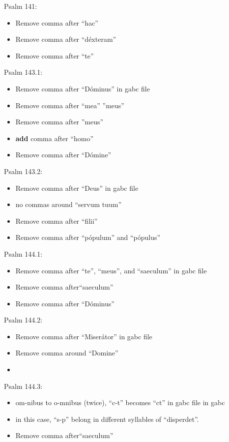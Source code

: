 \documentclass[11pt]{article}
\begin{document}
Psalm 141:
  \begin{itemize}
  \item Remove comma after ``hac''
  \item  Remove comma after ``déxteram''
    \item  Remove comma after ``te''

    \end{itemize}

      Psalm 143.1:
  \begin{itemize}
  \item Remove comma after ``Dóminus'' in gabc file
  \item  Remove comma after ``mea'' ''meus''
    \item  Remove comma after ''meus''
    \item
    \textbf{add} comma after ``homo''
      \item  Remove comma after ``Dómine'' 
    \end{itemize}

 Psalm 143.2:
  \begin{itemize}
  \item Remove comma after ``Deus'' in gabc file
    \item  no commas around ``servum tuum''
      \item Remove comma after ``filii'' 
   \item Remove comma after ``pópulum'' and ``pópulus'' 
    \end{itemize}

      Psalm 144.1:
  \begin{itemize}
    \item Remove comma after ``te'', ``meus'',  and ``saeculum'' in gabc file 
  \item   Remove comma after``saeculum''
    \item Remove comma after ``Dóminus'' 
    \end{itemize}

 Psalm 144.2:
  \begin{itemize}
      \item Remove comma after ``Miserátor'' in gabc file
  \item Remove comma around ``Domine''
  \item  
    \end{itemize}

 Psalm 144.3:
  \begin{itemize}
  \item om-nibus to o-mnibus (twice),  ``c-t'' becomes ``ct'' in gabc file in gabc
     \item in this case, ``s-p'' belong in different syllables of ``disperdet''.
  \item  Remove comma after``saeculum''
    \end{itemize}
\end{document}
